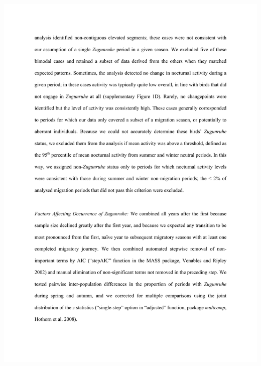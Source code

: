 \documentclass[a4paper, twoside]{templates/ociamthesis}
\begin{document}
\includegraphics[width=1\linewidth]{pdf_chapters/zug/zug_supp_crop_Part6}
\end{document}
